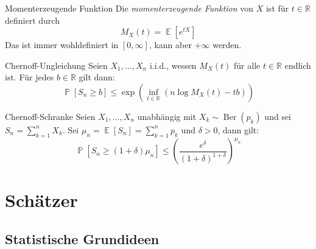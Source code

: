 \documentclass[a4paper,10pt]{article}
\def\R{\mathbb{R}}
\renewcommand{\P}{\operatorname{\mathbb{P}}}
\DeclareMathOperator{\E}{\mathbb{E}}
\DeclareMathOperator{\Ber}{Ber}
\DeclareMathOperator{\Bin}{Bin}
\numberwithin{equation}{section}
\begin{document}
\begin{mainbox}{Momenterzeugende Funktion}
    Die \emph{momenterzeugende Funktion} von \( X \) ist für \( t \in \R \) definiert durch
    \[
        M_X(t) = \E[e^{tX}]
    \]
    Das ist immer wohldefiniert in \( [0, \infty] \), kann aber \( +\infty \) werden.
\end{mainbox}



\begin{mainbox}{Chernoff-Ungleichung}
    Seien \( X_1, \dots, X_n\) i.i.d., wessen \( M_X(t) \) für alle \( t \in \R \) endlich ist. Für jedes \( b \in \R \) gilt dann:
    \[
        \P[S_n \geq b] \leq \exp\left( \inf_{t \in \R}(n \log M_X(t) - tb) \right)
    \]
\end{mainbox}

\begin{mainbox}{Chernoff-Schranke}
    Seien \( X_1, \dots, X_n \) unabhängig mit \( X_k \sim \Ber(p_k) \) und sei \( S_n = \sum_{k = 1}^n X_k \). Sei \( \mu_n = \E[S_n] = \sum_{k = 1}^n p_k \) und \( \delta > 0 \), dann gilt:
    \[
        \P[S_n \geq (1 + \delta) \mu_n] \leq \left( \frac{e^\delta}{(1 + \delta)^{1 + \delta}} \right)^{\mu_n}
    \]
\end{mainbox}

\section{Schätzer}

\subsection{Statistische Grundideen}
\end{document}
